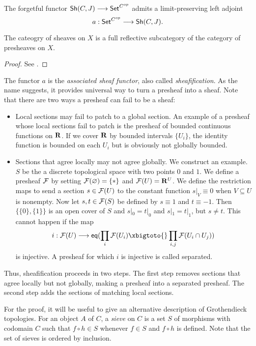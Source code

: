 \begin{theorem}
	The forgetful functor $\mathsf{Sh}(C,J) \longrightarrow \mathsf{Set}^{C^{op}}$ admits a limit-preserving left adjoint
	\[a : \mathsf{Set}^{C^{op}} \longrightarrow \mathsf{Sh}(C,J).\]
\end{theorem}
\begin{corollary}
	The cateogry of sheaves on $X$ is a full reflective subcategory of the category of presheaves on $X$.
\end{corollary}

\begin{proof}
	See \cite{MacLane/Moerdijk:1994}.
\end{proof}

The functor $a$ is the \textit{associated sheaf functor}, also called \textit{sheafification}. As the name suggests, it provides universal way to turn a presheaf into a sheaf.
Note that there are two ways a presheaf can fail to be a sheaf: 
\begin{itemize}
	\item 
		Local sections may fail to patch to a global section. An example of a presheaf whose local sections fail to patch is the presheaf of bounded continuous functions on $\mathbf{R}$. If we cover $\mathbf{R}$ by bounded intervals $\{U_i\}$, the identity function is bounded on each $U_i$ but is obviously not globally bounded. 
	\item 
		Sections that agree locally may not agree globally. We construct an example. $S$ be the a discrete topological space with two points $0$ and $1$. We define a presheaf $\mathcal{F}$ by setting $\mathcal{F}(\varnothing) = \{*\}$ and $\mathcal{F}(U) = \mathbf{R}^U$. We define the restriction maps to send a section $s \in \mathcal{F}(U)$ to the constant function $s|_V \equiv 0$ when $V \subseteq U$ is nonempty. Now let $s,t \in \mathcal{F}(S)$ be defined by $s \equiv 1$ and $t \equiv -1$. Then $\{\{0\}, \{1\}\}$ is an open cover of $S$ and $s|_{0} = t|_{0}$ and $s|_{1} = t|_{1}$, but $s \neq t$.
		This cannot happen if the map
		\[
			i: \Sh{F}(U) \to \mathsf{eq}(\prod_{i} \Sh{F}(U_i) \xbigtoto{} \prod_{i,j} \Sh{F}(U_i \cap U_j))
		\]
		is injective. A presheaf for which $i$ is injective is called separated.
\end{itemize} 

Thus, sheafification proceeds in two steps. The first step removes sections that agree locally but not globally, making a presheaf into a separated presheaf.  The second step adds the sections of matching local sections. 

For the proof, it will be useful to give an alternative description of Grothendieck topologies.  For an object $A$ of $C$, a \textit{sieve} on $C$ is a set $S$ of morphisms with codomain $C$ such that $f \circ h \in S$ whenever $f \in S$ and $f \circ h$ is defined. Note that the set of sieves is ordered by inclusion.


